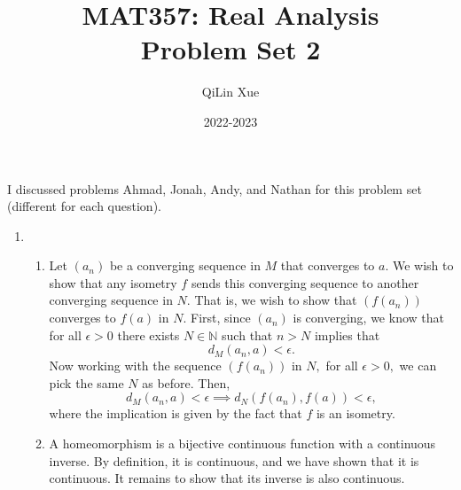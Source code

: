 \documentclass{article}
\title{\vspace{-2cm}MAT357: Real Analysis \\ Problem Set 2}
\author{QiLin Xue}
\date{2022-2023}
\numberwithin{equation}{section}
\begin{document}
\maketitle
I discussed problems Ahmad, Jonah, Andy, and Nathan for this problem set (different for each question).
\begin{enumerate}
    \item \begin{enumerate}[label=(\alph*)]
        \item Let $(a_n)$ be a converging sequence in $M$ that converges to $a.$ We wish to show that any isometry $f$ sends this converging sequence to another converging sequence in $N.$ That is, we wish to show that $(f(a_n))$ converges to $f(a)$ in $N.$ First, since $(a_n)$ is converging, we know that for all $\epsilon > 0$ there exists $N\in \mathbb{N}$ such that $n> N$ implies that 
        \begin{equation}
            d_M(a_n, a) < \epsilon.
        \end{equation}
        Now working with the sequence $(f(a_n))$ in $N,$ for all $\epsilon > 0,$ we can pick the same $N$ as before. Then,
        \begin{equation}
            d_M(a_n, a) < \epsilon \implies d_N(f(a_n), f(a)) < \epsilon,
        \end{equation}
        where the implication is given by the fact that $f$ is an isometry.
        \item A homeomorphism is a bijective continuous function with a continuous inverse. By definition, it is continuous, and we have shown that it is continuous. It remains to show that its inverse is also continuous.
        

\end{enumerate}
\end{enumerate}
\end{document}

